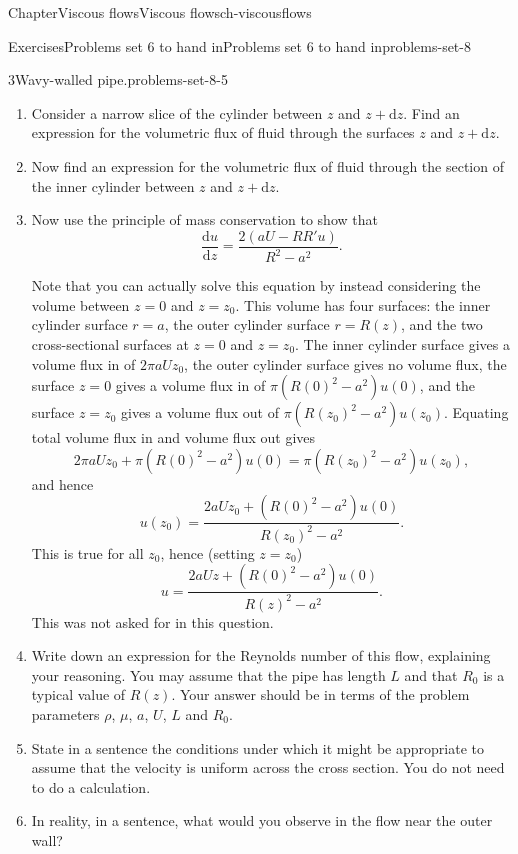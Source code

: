 \documentclass[oneside,10pt,]{book}
\numberwithin{equation}{section}
\newcommand{\de}{\mathrm{d}}
\newcommand{\dd}[2]{\frac{\de#1}{\de#2}}
\begin{document}
\begin{chapterptx}{Chapter}{Viscous flows}{}{Viscous flows}{}{}{ch-viscousflows}
\begin{exercises-section}{Exercises}{Problems set 6 to hand in}{}{Problems set 6 to hand in}{}{}{problems-set-8}
\begin{divisionexercise}{3}{Wavy-walled pipe.}{}{problems-set-8-5}
\begin{enumerate}[font=\bfseries,label=(\alph*),ref=\alph*]%
\item{}Consider a narrow slice of the cylinder between \(z\) and \(z+\de z\). Find an expression for the volumetric flux of fluid through the surfaces \(z\) and \(z+\de z\).%
\item{}Now find an expression for the volumetric flux of fluid through the section of the inner cylinder between \(z\) and \(z+\de z\).%
\item{}Now use the principle of mass conservation to show that%
\begin{equation*}
\dd{u}{z}=\frac{2(aU-RR'u)}{R^2-a^2}.
\end{equation*}
%
\par
Note that you can actually solve this equation by instead considering the volume between \(z=0\) and \(z=z_0\). This volume has four surfaces: the inner cylinder surface \(r=a\), the outer cylinder surface \(r=R(z)\), and the two cross-sectional surfaces at \(z=0\) and \(z=z_0\). The inner cylinder surface gives a volume flux in of \(2\pi aUz_0\), the outer cylinder surface gives no volume flux, the surface \(z=0\) gives a volume flux in of \(\pi(R(0)^2-a^2)u(0)\), and the surface \(z=z_0\) gives a volume flux out of \(\pi(R(z_0)^2-a^2)u(z_0)\). Equating total volume flux in and volume flux out gives%
\begin{equation*}
2\pi aUz_0+\pi(R(0)^2-a^2)u(0)=\pi(R(z_0)^2-a^2)u(z_0),
\end{equation*}
and hence%
\begin{equation*}
u(z_0)=\frac{2aUz_0+(R(0)^2-a^2)u(0)}{R(z_0)^2-a^2}.
\end{equation*}
This is true for all \(z_0\), hence (setting \(z=z_0\))%
\begin{equation*}
u=\frac{2aUz+(R(0)^2-a^2)u(0)}{R(z)^2-a^2}.
\end{equation*}
This was not asked for in this question.%
\item{}Write down an expression for the Reynolds number of this flow, explaining your reasoning. You may assume that the pipe has length \(L\) and that \(R_0\) is a typical value of \(R(z)\). Your answer should be in terms of the problem parameters \(\rho\), \(\mu\), \(a\), \(U\), \(L\) and \(R_0\).%
\item{}State in a sentence the conditions under which it might be appropriate to assume that the velocity is uniform across the cross section. You do not need to do a calculation.%
\item{}In reality, in a sentence, what would you observe in the flow near the outer wall?%
\end{enumerate}%
\end{divisionexercise}%
\end{exercises-section}
\end{chapterptx}
\end{document}
